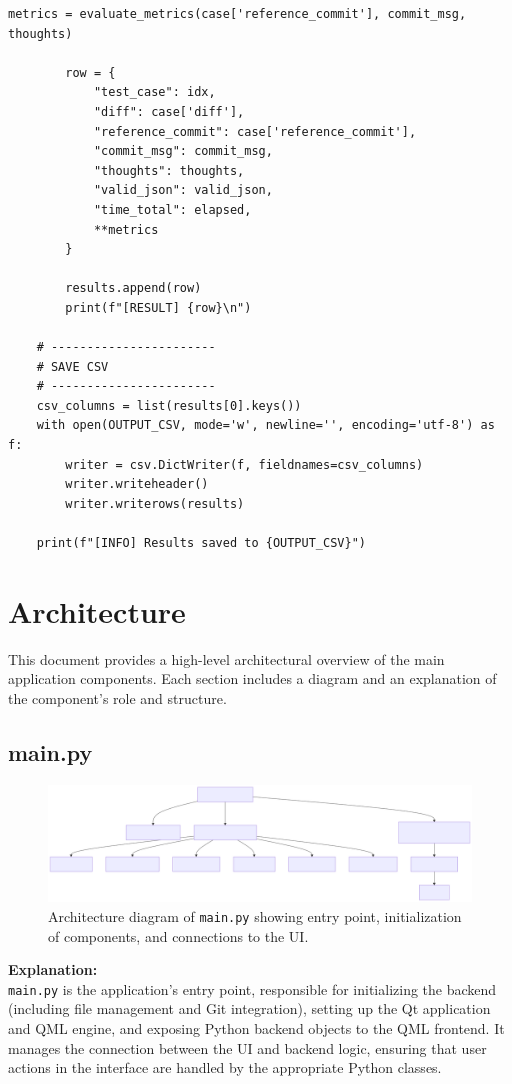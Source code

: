 \documentclass{report}
\begin{document}
\begin{lstlisting}[style=pythonstyle]
        metrics = evaluate_metrics(case['reference_commit'], commit_msg, thoughts)

        row = {
            "test_case": idx,
            "diff": case['diff'],
            "reference_commit": case['reference_commit'],
            "commit_msg": commit_msg,
            "thoughts": thoughts,
            "valid_json": valid_json,
            "time_total": elapsed,
            **metrics
        }

        results.append(row)
        print(f"[RESULT] {row}\n")

    # -----------------------
    # SAVE CSV
    # -----------------------
    csv_columns = list(results[0].keys())
    with open(OUTPUT_CSV, mode='w', newline='', encoding='utf-8') as f:
        writer = csv.DictWriter(f, fieldnames=csv_columns)
        writer.writeheader()
        writer.writerows(results)

    print(f"[INFO] Results saved to {OUTPUT_CSV}")

\end{lstlisting}
\chapter{Architecture}
This document provides a high-level architectural overview of the main application components. Each section includes a diagram and an explanation of the component's role and structure.
\section{main.py}

\begin{figure}[ht]
\centering
\includegraphics[width=\textwidth]{png_files/main_py_architecture.png}
\caption{Architecture diagram of \texttt{main.py} showing entry point, initialization of components, and connections to the UI.}
\end{figure}

\noindent
\textbf{Explanation:} \\
\texttt{main.py} is the application's entry point, responsible for initializing the backend (including file management and Git integration), setting up the Qt application and QML engine, and exposing Python backend objects to the QML frontend. It manages the connection between the UI and backend logic, ensuring that user actions in the interface are handled by the appropriate Python classes.
\end{document}

